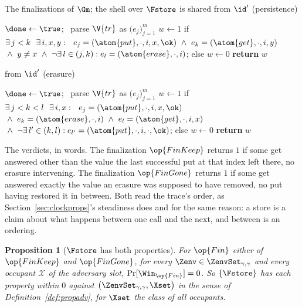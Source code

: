 \documentclass[10pt,oneside,openany]{book}
\theoremstyle{accentdef}
\theoremstyle{accentplain}
\newtheorem{proposition}[definition]{Proposition}
\begin{document}
\begin{interface}[nofloat]{The finalizations of $\Gm$; the shell over $\Fstore$ is shared}
 \quad from $\id'$ \quad (persistence)
\begin{algorithmic}[1]
\algcont
\Req{$\neg\done$}
\State $\done \gets \true$; \ parse $\V{tr}$ as $\bigl(e_j\bigr)_{j=1}^{m}$
\State $w \gets 1$ if $\exists\, j < k \ \ \exists\, i,x,y :\ \
       e_j = (\atom{put},\cdot,i,x,\ok) \ \wedge\ e_k = (\atom{get},\cdot,i,y)$ \label{ln:gkeep}
\State \quad ${}\wedge\ y \neq x
       \ \wedge\ \neg\exists\, l \in (j,k) : e_l = (\atom{erase},\cdot,i)$;
\State else $w \gets 0$
\State \textbf{return} $w$
\algsave
\end{algorithmic}
\vspace{1.4ex}

 \quad from $\id'$ \quad (erasure)
\begin{algorithmic}[1]
\algcont
\Req{$\neg\done$}
\State $\done \gets \true$; \ parse $\V{tr}$ as $\bigl(e_j\bigr)_{j=1}^{m}$
\State $w \gets 1$ if $\exists\, j < k < l \ \ \exists\, i,x :\ \
       e_j = (\atom{put},\cdot,i,x,\ok)$ \label{ln:ggone}
\State \quad ${}\wedge\ e_k = (\atom{erase},\cdot,i)
       \ \wedge\ e_l = (\atom{get},\cdot,i,x)$
\State \quad ${}\wedge\ \neg\exists\, l' \in (k,l) : e_{l'} = (\atom{put},\cdot,i,\cdot,\ok)$;
\State else $w \gets 0$
\State \textbf{return} $w$
\algsave
\end{algorithmic}
\end{interface}

The verdicts, in words. The finalization $\op{FinKeep}$ returns $1$ if some get answered other than the value the
last successful put at that index left there, no erasure intervening. The finalization $\op{FinGone}$ returns $1$
if some get answered exactly the value an erasure was supposed to have removed, no put having
restored it in between. Both read the trace's order, as Section~\ref{sec:clockprops}'s steadiness
does and for the same reason: a store is a claim about what happens between one call and the next,
and between is an ordering.

\begin{proposition}[$\Fstore$ has both properties]\label{prop:storeprops}
For $\op{Fin}$ either of $\op{FinKeep}$ and $\op{FinGone}$, for every
$\Zenv \in \ZenvSet_{\gamma,\gamma}$ and every occupant $\mathcal{X}$ of the adversary slot,
$\Pr[\Win_{\op{Fin}}] = 0$. So $\{\Fstore\}$ has each property within $0$ against
$\bigl(\ZenvSet_{\gamma,\gamma},\Xset\bigr)$ in the sense of Definition~\ref{def:propadv}, for
$\Xset$ the class of all occupants.
\end{proposition}
\end{document}
